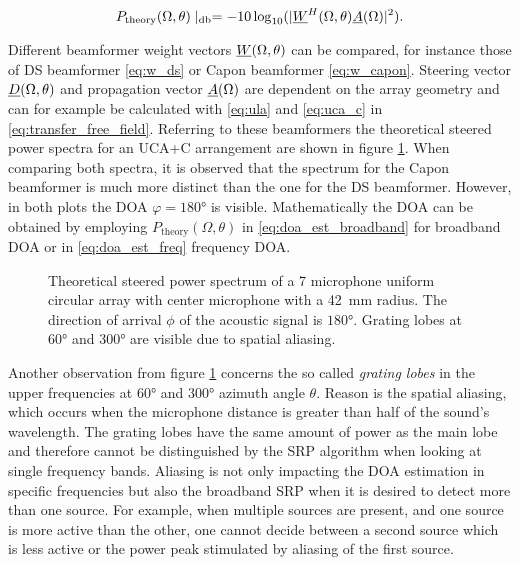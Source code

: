\begin{equation}
P_\text{theory}(\Omega,\theta) \mid _\text{db} = -10\log_{10}(|\underline{W}^H(\Omega,\theta)\underline{A}(\Omega)|^2).
\label{eq:p_theory}
\end{equation}

Different beamformer weight vectors $\underline{W}(\Omega,\theta)$ can be compared, for instance those of \ac{DS} beamformer \ref{eq:w_ds} or Capon beamformer \ref{eq:w_capon}. Steering vector $\underline{D}(\Omega,\theta)$ and propagation vector $\underline{A}(\Omega)$ are dependent on the array geometry and can for example be calculated with \ref{eq:ula} and \ref{eq:uca_c} in \ref{eq:transfer_free_field}. \cite[Chapter~2]{brandstein2013microphone}
Referring to these beamformers the theoretical steered power spectra for an \ac{UCA+C} arrangement are shown in figure \ref{fig:beampattern}. When comparing both spectra, it is observed that the spectrum for the Capon beamformer is much more distinct than the one for the \ac{DS} beamformer. However, in both plots the \ac{DOA} $\varphi = \ang{180}$ is visible. Mathematically the \ac{DOA} can be obtained by employing $P_\text{theory}(\Omega,\theta)$ in \ref{eq:doa_est_broadband} for broadband \ac{DOA} or in \ref{eq:doa_est_freq} frequency \ac{DOA}. \\
\label{subsec:pattern_aliasing}
\begin{figure}[!ht]
	\hfill
	\caption{Theoretical steered power spectrum of a 7 microphone uniform circular array with center microphone with a \SI{42}{\milli\meter} radius. The direction of arrival $\phi$ of the acoustic signal is $\ang{180}$. Grating lobes at $\ang{60}$ and $\ang{300}$ are visible due to spatial aliasing.}
	\label{fig:beampattern}
\end{figure}
Another observation from figure \ref{fig:beampattern} concerns the so called \emph{grating lobes} in the upper frequencies at $\ang{60}$ and $\ang{300}$ azimuth angle $\theta$. Reason is the spatial aliasing, which occurs when the microphone distance is greater than half of the sound's wavelength. The grating lobes have the same amount of power as the main lobe and therefore cannot be distinguished by the \ac{SRP} algorithm when looking at single frequency bands. Aliasing is not only impacting the DOA estimation in specific frequencies but also the broadband \ac{SRP} when it is desired to detect more than one source. For example, when multiple sources are present, and one source is more active than the other, one cannot decide between a second source which is less active or the power peak stimulated by aliasing of the first source.\\
